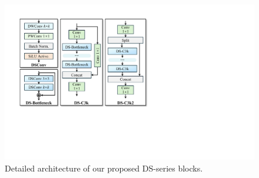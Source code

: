 \begin{figure}[!tbp]
    \centering
    \includegraphics[width=1\linewidth]{figures/dsblocks.pdf}
    \vspace{-0.5cm}
    \caption{Detailed architecture of our proposed DS-series blocks.}
    \vspace{-0.4cm}
    \label{fig:dsblock}
\end{figure}